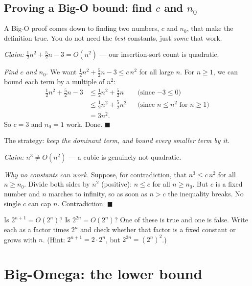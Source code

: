 \subsection{Proving a Big-O bound: find $c$ and $n_0$}

A Big-O proof comes down to finding two numbers, $c$ and $n_0$, that make the
definition true. You do not need the \emph{best} constants, just \emph{some} that work.

\begin{example}\label{ch03:ex-poly-bigo}
\emph{Claim:} $\frac12 n^2 + \frac52 n - 3 = O(n^2)$ --- our insertion-sort count is
quadratic.

\emph{Find $c$ and $n_0$.} We want $\frac12 n^2 + \frac52 n - 3 \le c\,n^2$ for all
large $n$. For $n \ge 1$, we can bound each term by a multiple of $n^2$:
\begin{align*}
  \tfrac12 n^2 + \tfrac52 n - 3
  &\le \tfrac12 n^2 + \tfrac52 n && \text{(since $-3 \le 0$)} \\
  &\le \tfrac12 n^2 + \tfrac52 n^2 && \text{(since $n \le n^2$ for $n \ge 1$)} \\
  &= 3 n^2 .
\end{align*} So $c = 3$ and $n_0 = 1$ work. Done.
\hfill$\blacksquare$
\end{example}

The strategy: \emph{keep the dominant term, and bound every smaller term by it.}

\begin{example}\label{ch03:ex-cubic-not}
\emph{Claim:} $n^3 \ne O(n^2)$ --- a cubic is genuinely not quadratic.

\emph{Why no constants can work.} Suppose, for contradiction, that $n^3 \le c\,n^2$
for all $n \ge n_0$. Divide both sides by $n^2$ (positive): $n \le c$ for all
$n \ge n_0$. But $c$ is a fixed number and $n$ marches to infinity, so as soon as
$n > c$ the inequality breaks. No single $c$ can cap $n$. Contradiction. \hfill$\blacksquare$
\end{example}

\begin{walkbox}
Is $2^{n+1} = O(2^n)$? Is $2^{2n} = O(2^n)$?
One of these is true and one is false. Write each as a factor times
$2^n$ and check whether that factor is a fixed constant or grows with $n$.
(Hint: $2^{n+1} = 2\cdot 2^n$, but $2^{2n} = (2^n)^2$.)
\end{walkbox}

\section{Big-Omega: the lower bound}

